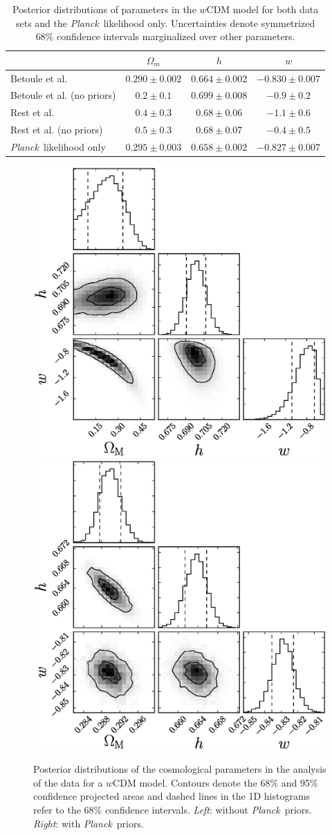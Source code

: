 \documentclass[12pt,a4paper]{article}
\newcommand\Planck{{\it Planck}\ }
\begin{document}
%
\begin{table}[h]
  \centering
  \begin{tabular}{l|ccc}
    ~                          & $\Omega_m$ & $h$ & $w$ \\ \hline
    Betoule et al.             & $0.290 \pm 0.002$                      & $0.664 \pm 0.002$     & $-0.830 \pm 0.007$     \\
    Betoule et al. (no priors) & $0.2 \pm 0.1$                      & $0.699 \pm 0.008$     & $-0.9 \pm 0.2$     \\
    Rest et al.                & $0.4 \pm 0.3$                      & $0.68 \pm 0.06$     & $-1.1 \pm 0.6$     \\
    Rest et al. (no priors)    & $0.5 \pm 0.3$                      & $0.68 \pm 0.07$    & $-0.4 \pm 0.5$     \\
    \Planck likelihood only    & $0.295 \pm 0.003$                      & $0.658 \pm 0.002$     & $-0.827 \pm 0.007$     \\
  \end{tabular}
  \caption {Posterior distributions of parameters in the
    $w$CDM model for both data sets and the \Planck likelihood only. 
    Uncertainties denote symmetrized 68\%
    confidence intervals marginalized over other parameters.}
  \label{tab:wcdm}
\end{table}
%
\begin{figure}
  \includegraphics[width=0.5\linewidth]{figures/betoule_wcdm_noprior_corner.eps}
  \includegraphics[width=0.5\linewidth]{figures/betoule_wcdm_withprior_corner.eps}
  \caption{Posterior distributions of the cosmological parameters in the
    analysis of the \citet{betoule2014} data for a $w$CDM model. Contours denote the
    68\% and 95\% confidence projected areas and dashed lines in
    the 1D histograms refer to the 68\% confidence intervals. {\it Left}: without 
    \Planck priors. {\it Right}: with \Planck priors.}
  \label{fig:betoule_wcdm_corner}
\end{figure}
\end{document}
